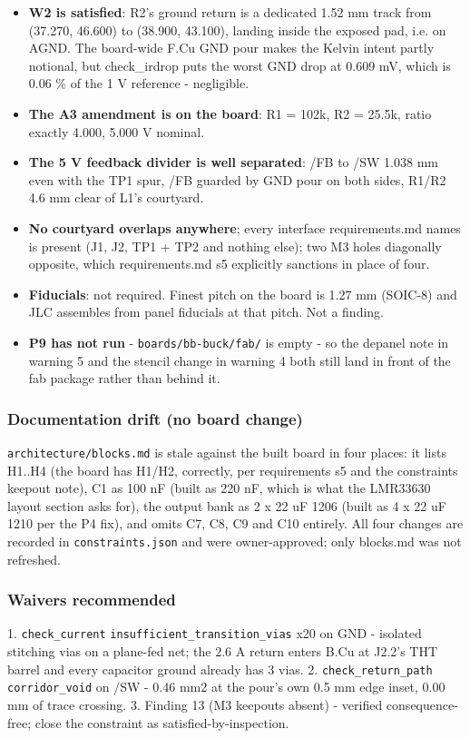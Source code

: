 \documentclass[11pt,a4paper]{article}
\begin{document}
\begin{itemize}
pin 4 PG left open, which the datasheet permits.
\item \textbf{W2 is satisfied}: R2's ground return is a dedicated 1.52 mm track from
(37.270, 46.600) to (38.900, 43.100), landing inside the exposed pad, i.e. on AGND.
The board-wide F.Cu GND pour makes the Kelvin intent partly notional, but
check\_irdrop puts the worst GND drop at 0.609 mV, which is 0.06 \% of the 1 V
reference - negligible.
\item \textbf{The A3 amendment is on the board}: R1 = 102k, R2 = 25.5k, ratio exactly 4.000,
5.000 V nominal.
\item \textbf{The 5 V feedback divider is well separated}: /FB to /SW 1.038 mm even with the
TP1 spur, /FB guarded by GND pour on both sides, R1/R2 4.6 mm clear of L1's
courtyard.
\item \textbf{No courtyard overlaps anywhere}; every interface requirements.md names is
present (J1, J2, TP1 + TP2 and nothing else); two M3 holes diagonally opposite,
which requirements.md s5 explicitly sanctions in place of four.
\item \textbf{Fiducials}: not required. Finest pitch on the board is 1.27 mm (SOIC-8) and JLC
assembles from panel fiducials at that pitch. Not a finding.
\item \textbf{P9 has not run} - \texttt{boards/bb-buck/fab/} is empty - so the depanel note in
warning 5 and the stencil change in warning 4 both still land in front of the fab
package rather than behind it.
\end{itemize}
\subsubsection*{Documentation drift (no board change)}
\texttt{architecture/blocks.md} is stale against the built board in four places: it lists H1..H4 (the board has H1/H2, correctly, per requirements s5 and the constraints keepout note), C1 as 100 nF (built as 220 nF, which is what the LMR33630 layout section asks for), the output bank as 2 x 22 uF 1206 (built as 4 x 22 uF 1210 per the P4 fix), and omits C7, C8, C9 and C10 entirely. All four changes are recorded in \texttt{constraints.json} and were owner-approved; only blocks.md was not refreshed.

\subsubsection*{Waivers recommended}
1. \texttt{check\_current} \texttt{insufficient\_transition\_vias} x20 on GND - isolated stitching vias on a plane-fed net; the 2.6 A return enters B.Cu at J2.2's THT barrel and every capacitor ground already has 3 vias. 2. \texttt{check\_return\_path} \texttt{corridor\_void} on /SW - 0.46 mm2 at the pour's own 0.5 mm edge inset, 0.00 mm of trace crossing. 3. Finding 13 (M3 keepouts absent) - verified consequence-free; close the constraint as satisfied-by-inspection.
\end{document}
